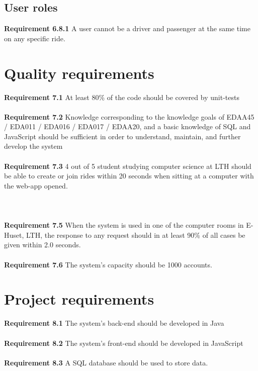 \documentclass{article}
\begin{document}
\subsection{User roles}
\textbf{Requirement 6.8.1} A user cannot be a driver and passenger at the same time on any specific ride.

\section{Quality requirements}
\textbf{Requirement 7.1} At least 80\% of the code should be covered by unit-tests
\\ \\
\textbf{Requirement 7.2} Knowledge corresponding to the knowledge goals of EDAA45 / EDA011 / EDA016 / EDA017 / EDAA20, and a basic knowledge of SQL and JavaScript should be sufficient in order to understand, maintain, and further develop the system
\\ \\
\textbf{Requirement 7.3} 4 out of 5 student studying computer science at LTH should be able to create or join rides within 20 seconds when sitting at a computer with the web-app opened.
\\ \\

\\ \\
\textbf{Requirement 7.5} When the system is used in one of the computer rooms in E-Huset, LTH, the response to any request should in at least 90\% of all cases be given within 2.0 seconds.
\\ \\
\textbf{Requirement 7.6} The system's capacity should be 1000 accounts.

\section{Project requirements}


\textbf{Requirement 8.1} The system's back-end should be developed in Java
\\ \\
\textbf{Requirement 8.2} The system's front-end should be developed in JavaScript
\\ \\
\textbf{Requirement 8.3} A SQL database should be used to store data.
\end{document}
